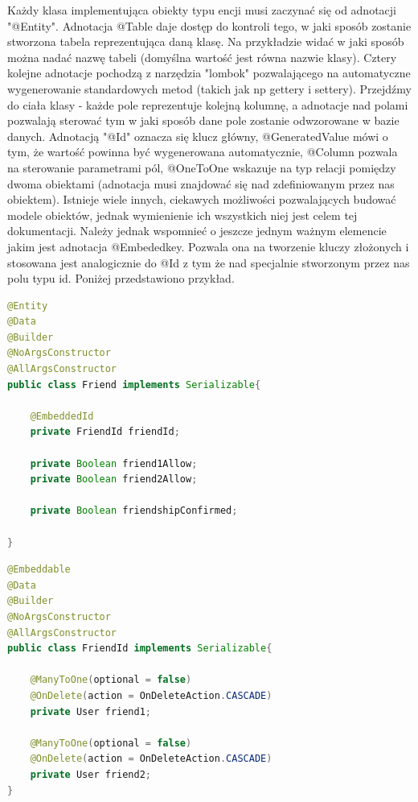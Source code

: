 \documentclass{report}
\begin{document}
		Każdy klasa implementująca obiekty typu encji musi zaczynać się od adnotacji "@Entity". Adnotacja @Table daje dostęp do kontroli tego, w jaki sposób zostanie stworzona tabela reprezentująca daną klasę. Na przykładzie widać w jaki sposób można nadać nazwę tabeli (domyślna wartość jest równa nazwie klasy). Cztery kolejne adnotacje pochodzą z narzędzia "lombok" pozwalającego na automatyczne wygenerowanie standardowych metod (takich jak np gettery i settery). Przejdźmy do ciała klasy - każde pole reprezentuje kolejną kolumnę, a adnotacje nad polami pozwalają sterować tym w jaki sposób dane pole zostanie odwzorowane w bazie danych. Adnotacją "@Id" oznacza się klucz główny, @GeneratedValue mówi o tym, że wartość powinna być wygenerowana automatycznie, @Column pozwala na sterowanie parametrami pól, @OneToOne wskazuje na typ relacji pomiędzy dwoma obiektami (adnotacja musi znajdować się nad zdefiniowanym przez nas obiektem). Istnieje wiele innych, ciekawych możliwości pozwalających budować modele obiektów, jednak wymienienie ich wszystkich niej jest celem tej dokumentacji. Należy jednak wspomnieć o jeszcze jednym ważnym elemencie jakim jest adnotacja @Embededkey. Pozwala ona na tworzenie kluczy złożonych i stosowana jest analogicznie do @Id z tym że nad specjalnie stworzonym przez nas polu typu id. Poniżej przedstawiono przykład.


		\begin{lstlisting}[language=Java, breaklines]
@Entity
@Data
@Builder
@NoArgsConstructor
@AllArgsConstructor
public class Friend implements Serializable{

    @EmbeddedId
    private FriendId friendId;

    private Boolean friend1Allow;
    private Boolean friend2Allow;

    private Boolean friendshipConfirmed;

}
		\end{lstlisting}

		\begin{lstlisting}[language=Java, breaklines]
@Embeddable
@Data
@Builder
@NoArgsConstructor
@AllArgsConstructor
public class FriendId implements Serializable{

    @ManyToOne(optional = false)
    @OnDelete(action = OnDeleteAction.CASCADE)
    private User friend1;

    @ManyToOne(optional = false)
    @OnDelete(action = OnDeleteAction.CASCADE)
    private User friend2;
}
		\end{lstlisting}
\end{document}
